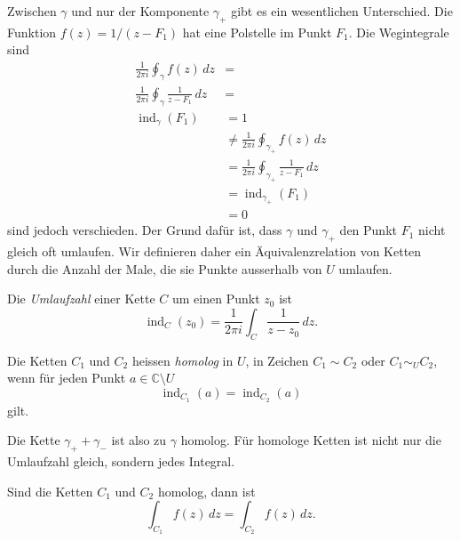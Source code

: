 Zwischen $\gamma$ und nur der Komponente $\gamma_+$ gibt es
ein wesentlichen Unterschied.
Die Funktion $f(z) = 1/(z-F_1)$ hat eine Polstelle im Punkt $F_1$.
Die Wegintegrale sind
\begin{align*}
\frac{1}{2\pi i}
\oint_\gamma f(z)\,dz
&=
\\
\frac{1}{2\pi i}
\oint_\gamma \frac{1}{z-F_1}\,dz
&=
\\
\operatorname{ind}_\gamma(F_1)
&=
1
\\
&\ne
\frac{1}{2\pi i}
\oint_{\gamma_+} f(z)\,dz
\\
&=
\frac{1}{2\pi i}
\oint_{\gamma_+} \frac{1}{z-F_1}\,dz
\\
&=
\operatorname{ind}_{\gamma_+}(F_1)
\\
&=
0
\end{align*}
sind jedoch verschieden.
Der Grund dafür ist, dass $\gamma$ und $\gamma_+$ den Punkt $F_1$
nicht gleich oft umlaufen.
Wir definieren daher ein Äquivalenzrelation von Ketten durch die
Anzahl der Male, die sie Punkte ausserhalb von $U$ umlaufen.

\begin{definition}
Die \emph{Umlaufzahl} einer Kette $C$ um einen Punkt $z_0$ ist
%
\[
\operatorname{ind}_C(z_0)
=
\frac{1}{2\pi i}
\int_C
\frac{1}{z-z_0}
\,dz.
\]
\end{definition}

\begin{definition}[homolog]
Die Ketten $C_1$ und $C_2$ heissen \emph{homolog} in $U$, in Zeichen
$C_1\sim C_2$ oder $C_1\sim_{U}C_2$, wenn
%
für jeden Punkt $a\in \mathbb{C}\setminus U$
\[
\operatorname{ind}_{C_1}(a)
=
\operatorname{ind}_{C_2}(a)
\]
gilt.
\end{definition}

Die Kette $\gamma_++\gamma_-$ ist also zu $\gamma$ homolog.
Für homologe Ketten ist nicht nur die Umlaufzahl gleich, sondern
jedes Integral.

\begin{satz}
Sind die Ketten $C_1$ und $C_2$ homolog, dann ist
\[
\int_{C_1} f(z)\,dz
=
\int_{C_2} f(z)\,dz.
\]
\end{satz}

